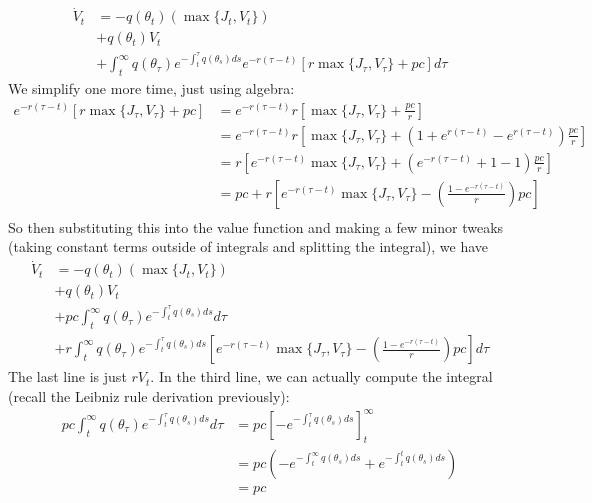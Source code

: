\documentclass[12pt]{article}
\begin{document}
\begin{itemize}
    \[\begin{split}
        \dot{V}_t &= -q(\theta_t)\left(\max \{J_t, V_t\}\right) \\
        &+q(\theta_t)V_t \\
        &+\int_t^{\infty} q(\theta_{\tau}) e^{-\int_t^{\tau}q(\theta_s)ds} e^{-r(\tau - t)}\left[r\max \{J_{\tau}, V_{\tau}\} +pc\right]d\tau
    \end{split}\]
    We simplify one more time, just using algebra:
    \[\begin{split}
        e^{-r(\tau - t)}\left[r\max \{J_{\tau}, V_{\tau}\}+pc\right] &= e^{-r(\tau - t)}r\left[\max \{J_{\tau}, V_{\tau}\}+\frac{pc}{r}\right] \\
        &= e^{-r(\tau - t)}r\left[\max \{J_{\tau}, V_{\tau}\}+\left(1 + e^{r(\tau - t)} - e^{r(\tau - t)} \right)\frac{pc}{r}\right] \\
        &= r\left[e^{-r(\tau - t)}\max \{J_{\tau}, V_{\tau}\}+\left(e^{-r(\tau - t)} + 1 - 1\right)\frac{pc}{r}\right] \\
        &= pc + r\left[e^{-r(\tau - t)}\max \{J_{\tau}, V_{\tau}\}-\left(\frac{1-e^{-r(\tau - t)}}{r} \right)pc\right] \\
    \end{split}\]
    So then substituting this into the value function and making a few minor tweaks (taking constant terms outside of integrals and splitting the integral), we have
    \[\begin{split}
        \dot{V}_t &= -q(\theta_t)\left(\max \{J_t, V_t\}\right) \\
        &+q(\theta_t)V_t \\
        &+pc\int_t^{\infty} q(\theta_{\tau}) e^{-\int_t^{\tau}q(\theta_s)ds}d\tau\\
        &+ r\int_t^{\infty}q(\theta_{\tau})e^{-\int_t^{\tau}q(\theta_s)ds}\left[e^{-r(\tau - t)}\max \{J_{\tau}, V_{\tau}\}-\left(\frac{1-e^{-r(\tau - t)}}{r} \right)pc\right]d\tau
    \end{split}\]
    The last line is just $rV_t$. In the third line, we can actually compute the integral (recall the Leibniz rule derivation previously):
    \[\begin{split}
        pc\int_t^{\infty} q(\theta_{\tau}) e^{-\int_t^{\tau}q(\theta_s)ds}d\tau &= pc\left[-e^{-\int_t^{\tau}q(\theta_s)ds}\right]_t^{\infty} \\
        &= pc\left(-e^{-\int_t^{\infty}q(\theta_s)ds} + e^{-\int_t^tq(\theta_s)ds}\right) \\
        &= pc
    \end{split}\]

\end{itemize}
\end{document}
